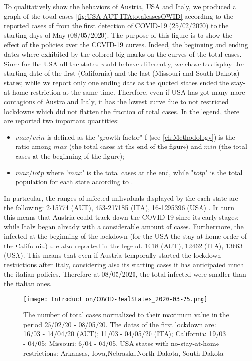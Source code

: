 \documentclass[a4paper,10pt,twoside]{book} %
\theoremstyle{definition}
\begin{document}
To qualitatively show the behaviors of Austria, USA and Italy, we produced a graph of the total cases \autoref{fig:USA-AUT-ITAtotalcasesOWID} according to the reported cases of \cite{JHUGitHub:2020_TotalCases} from the first detection of COVID-19 (25/02/2020) to the starting days of May (08/05/2020). The purpose of this figure is to show the effect of the policies over the COVID-19 curves.
Indeed, the beginning and ending dates where exhibited by the colored big marks on the curves of the total cases. Since for the USA all the states could behave differently, we chose to display the starting date of the first (California) and the last (Missouri and South Dakota) states; while we report only one ending date as the quoted states ended the stay-at-home restriction at the same time.
Therefore, even if USA has got many more contagions of Austra and Italy, it has the lowest curve due to not restricted lockdowns which did not flatten the fraction of total cases. 
In the legend, there are reported two important quantities:
\begin{itemize}
	\item $max/min$ is defined as the "growth factor" f (see \autoref{ch:Methodology}) is the ratio among $max$ (the total cases at the end of the figure) and $min$ (the total cases at the beginning of the figure);
	\item $max / totp$ where "$max$" is the total cases at the end, while "$totp$" is the total population for each state according to \cite{PopulationEstimate}.
\end{itemize}
In particular, the ranges of infected individuals displayed by the each state are the following: 2-15774 (AUT), 453-217185 (ITA), 16-1295396 (USA) \cite{Anderson:1972_MoreIsDifferent}. In turn, this means that Austria could track down the COVID-19 since its early stages; while Italy began already with a considerable amount of cases. Furthermore, the infected at the beginning of the lockdown (for the USA the stay-at-home-order of the California) are also reported in the legend: 1018 (AUT), 12462 (ITA), 13663 (USA). This means that even if Austria temporally started the lockdown restrictions after Italy, considering also its starting cases it has anticipated much the italian policies. Therefore at 08/05/2020, the total infected were smaller than the italian ones.
\begin{figure}[tbp]
	\centering
	\texttt{[image: Introduction/COVID-RealStates\_2020-03-25.png]}
	\caption{The number of total cases normalized to their maximum value in the period 25/02/20 - 08/05/20. The dates of the first lockdown are: 16/03 - 14/04/20 (AUT); 11/03 - 04/05/20 (ITA); California: 19/03 - 04/05; Missouri: 6/04 - 04/05. USA states with no-stay-at-home restrictions: Arkansas,	Iowa,Nebraska,North Dakota,	South Dakota}
	\label{fig:USA-AUT-ITAtotalcasesOWID}
\end{figure}
\end{document}
